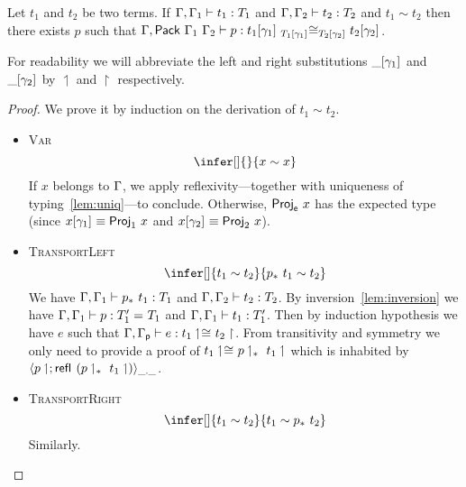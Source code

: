 \begin{lemma}
  Let $t_1$ and $t_2$ be two terms. If $\isterm{\Ga, \Ga_1}{t_1}{T_1}$ and
  $\isterm{\Ga, \Ga_2}{t_2}{T_2}$ and $t_1 \sim t_2$ then there exists $p$ such
  that
  $\isterm{\Ga, \Pack{\Ga_1}{\Ga_2}}
          {p}
          {\Heq{\llift{\gamma}{}{T_1}}
               {\llift{\gamma}{}{t_1}}
               {\rlift{\gamma}{}{T_2}}
               {\rlift{\gamma}{}{t_2}}}$.
\end{lemma}

For readability we will abbreviate the left and right substitutions
$\llift{\gamma}{}{\_}$ and $\rlift{\gamma}{}{\_}$ by $\upharpoonleft$
and $\upharpoonright$ respectively.

\begin{proof}
  We prove it by induction on the derivation of $t_1 \sim t_2$.

  \begin{itemize}
    \item \textsc{Var}
    \[
      \infer[]
        { }
        {x \sim x}
    \]
    If $x$ belongs to $\Ga$, we apply reflexivity---together with uniqueness of
    typing~\eqref{lem:uniq}---to conclude.
    Otherwise, $\ProjE{x}$ has the expected type (since
    $\llift{\gamma}{}{x} \equiv \ProjO{x}$ and $\rlift{\gamma}{}{x} \equiv \ProjT{x}$).

    \item \textsc{TransportLeft}
    \[
      \infer[]
        {t_1 \sim t_2}
        {\transpo{p}\ t_1 \sim t_2}
    \]
    We have $\isterm{\Ga, \Ga_1}{\transpo{p}\ t_1}{T_1}$ and
    $\isterm{\Ga, \Ga_2}{t_2}{T_2}$.
    By inversion~\eqref{lem:inversion} we have
    $\isterm{\Ga, \Ga_1}{p}{\Eq{}{T_1'}{T_1}}$ and
    $\isterm{\Ga, \Ga_1}{t_1}{T_1'}$.
    Then by induction hypothesis we have $e$ such that
    $\isterm{\Ga, \Gp}{e}{\Heq{}{\lo{t_1}}{}{\ro{t_2}}}$.
    From transitivity and symmetry we only need to provide a proof of
    $\Heq{}{\lo{t_1}}{}{\transpo{\lo{p}}\ \lo{t_1}}$ which is inhabited by
    $\pair{\_}{\_}{\lo{p}}{\refl{} (\transpo{\lo{p}}\ \lo{t_1})}$.

    \item \textsc{TransportRight}
    \[
      \infer[]
        {t_1 \sim t_2}
        {t_1 \sim \transpo{p}\ t_2}
    \]
    Similarly.


\end{itemize}
\end{proof}
